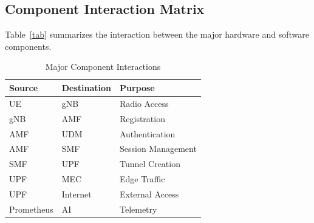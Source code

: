 \documentclass[12pt,a4paper]{article}\usepackage[a4paper,margin=1in]{geometry}\usepackage{graphicx}\usepackage{longtable}\usepackage{booktabs}\usepackage{hyperref}\usepackage{enumitem}\usepackage{amsmath}\usepackage{tikz}\usepackage{pgfgantt}\usepackage{setspace}\setstretch{1.15}\usetikzlibrary{positioning,arrows.meta,shapes.geometric}
\begin{document}
	
	\subsection{Component Interaction Matrix}
	
	Table~\ref{tab} summarizes the interaction between the major hardware and software components.
	
	\begin{table}[h]
		
		\centering
		
		\caption{Major Component Interactions}
		
		\label{tab:interaction}
		
		\begin{tabular}{lll}
			
			\toprule
			
			Source
			
			&
			
			Destination
			
			&
			
			Purpose
			
			\\
			
			\midrule
			
			UE & gNB & Radio Access
			
			\\
			
			gNB & AMF & Registration
			
			\\
			
			AMF & UDM & Authentication
			
			\\
			
			AMF & SMF & Session Management
			
			\\
			
			SMF & UPF & Tunnel Creation
			
			\\
			
			UPF & MEC & Edge Traffic
			
			\\
			
			UPF & Internet & External Access
			
			\\
			
			Prometheus & AI & Telemetry
			

\end{tabular}
\end{table}
\end{document}
